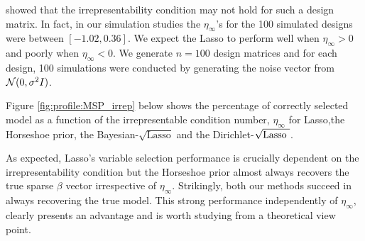 \documentclass[ba]{imsart}
\def\sql{$\sqrt{\text{Lasso}}$}
\def\sqdl{Dirichlet-$\sqrt{\text{\rm{Lasso} }}$}
\begin{document}
\citet{zhao2006model} showed that the irrepresentability condition may not hold for such a design matrix. In fact, in our simulation studies the $\eta_\infty$'s for the 100 simulated designs were between $[-1.02, 0.36]$. We expect the Lasso to perform well when $\eta_\infty>0$ and poorly when $\eta_\infty<0$. We generate $n = 100$ design matrices and for each design, 100 simulations were conducted by generating the noise vector from $\mathcal{N}(0, \sigma^2 I)$.

Figure \ref{fig:profile:MSP_irrep} below shows the percentage of correctly selected model as a function of the irrepresentable condition number, $\eta_\infty$ for Lasso,the Horseshoe prior, the Bayesian-\sql{} and the \sqdl{}.

As expected, Lasso's variable selection performance is crucially dependent on the irrepresentability condition but the Horseshoe prior almost always recovers the true sparse $\beta$ vector irrespective of $\eta_\infty$. Strikingly, both our methods succeed in always recovering the true model. This strong performance independently of  $\eta_\infty$, clearly presents an advantage and is worth studying from a theoretical view point.
\end{document}
